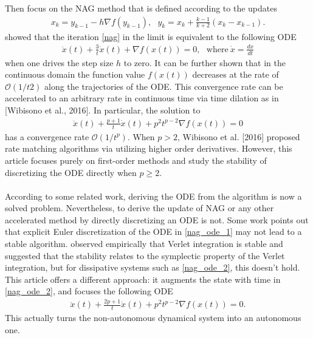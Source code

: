 Then focus on the NAG method that is defined according to the updates
\begin{align}\label{nag}
  x_{k} = y_{k-1} - h \nabla f(y_{k-1}),\ \ \ y_{k} = x_{k} + \frac{k-1}{k+2} (x_{k} - x_{k-1}).
\end{align}
\textcite{JMLR:v17:15-084} showed that the iteration \ref{nag} in the limit is equivalent to the
following ODE
\begin{align}\label{nag_ode_1}
  \ddot{x}(t) + \frac{3}{t} \dot{x}(t) + \nabla f(x(t)) = 0,\ \ \ \mathrm{where\ }
  \dot{x} = \frac{dx}{dt}
\end{align}
when one drives the step size $h$ to zero. It can be further shown that in the
continuous domain the function value $f(x(t))$ decreases at the rate of $\mathcal{O}(1/t2)$
along the trajectories of the ODE. This convergence rate can be accelerated to an
arbitrary rate in continuous time via time dilation as in [Wibisono et al., 2016].
In particular, the solution to
\begin{align}\label{nag_ode_2}
  \ddot{x}(t) + \frac{p+1}{t} \dot{x}(t) + p^{2}t^{p-2} \nabla f(x(t)) = 0
\end{align}
has a convergence rate $\mathcal{O}(1/t^{p})$. When $p > 2$, Wibisono et al. [2016] proposed rate matching
algorithms via utilizing higher order derivatives. However, this article focuses purely on
first-order methods and study the stability of discretizing the ODE directly when
$p \geq 2$.
\\\\According to some related work, deriving the ODE from the algorithm is now a solved
problem. Nevertheless, to derive the update of NAG or any other
accelerated method by directly discretizing an ODE is not. Some work points out that
explicit Euler discretization of the ODE in \ref{nag_ode_1} may not lead to a stable
algorithm. \textcite{https://doi.org/10.48550/arxiv.1802.03653} observed empirically that Verlet
integration is stable and suggested that the stability relates to the symplectic
property of the Verlet integration, but for dissipative systems such as \ref{nag_ode_2},
this doesn't hold. This article offers a different approach: it augments the state with
time in \ref{nag_ode_2}, and focuses the following ODE
\begin{align}\label{nag_ode_final}
  \ddot{x}(t) + \frac{2p+1}{t} \dot{x}(t) + p^{2}t^{p-2} \nabla f(x(t)) = 0.
\end{align}
This actually turns the non-autonomous dynamical system into an autonomous one.

